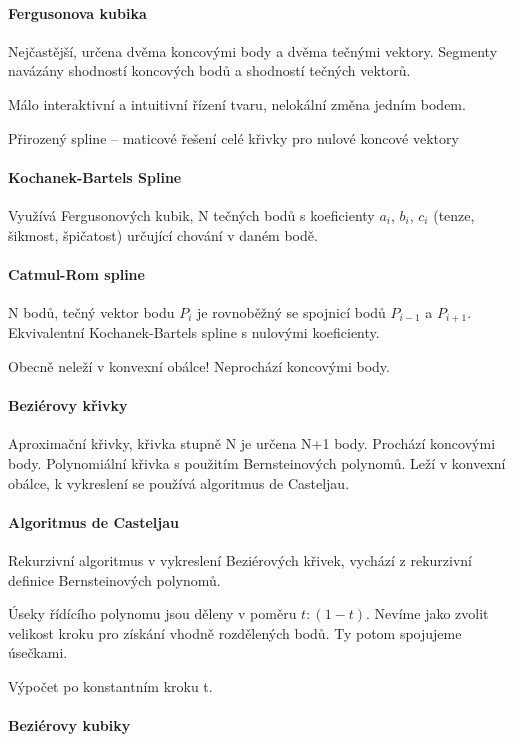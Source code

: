 \documentclass[a4paper, 11pt]{report}
\begin{document}
\paragraph{Fergusonova kubika} Nejčastější, určena dvěma koncovými body a dvěma tečnými vektory. Segmenty navázány shodností koncových bodů a shodností tečných vektorů.

Málo interaktivní a intuitivní řízení tvaru, nelokální změna jedním bodem.

Přirozený spline -- maticové řešení celé křivky pro nulové koncové vektory

\paragraph{Kochanek-Bartels Spline}

Využívá Fergusonových kubik, N tečných bodů s koeficienty $a_i$, $b_i$, $c_i$ (tenze, šikmost, špičatost) určující chování v daném bodě.

\paragraph{Catmul-Rom spline}

N bodů, tečný vektor bodu $P_i$ je rovnoběžný se spojnicí bodů $P_{i-1}$ a $P_{i+1}$. Ekvivalentní Kochanek-Bartels spline s nulovými koeficienty.

Obecně neleží v konvexní obálce! Neprochází koncovými body.

\paragraph{Beziérovy křivky}
Aproximační křivky, křivka stupně N je určena N+1 body. Prochází koncovými body. Polynomiální křivka s použitím Bernsteinových polynomů. Leží v konvexní obálce, k vykreslení se používá algoritmus de Casteljau.

\paragraph{Algoritmus de Casteljau} Rekurzivní algoritmus v vykreslení Beziérových křivek, vychází z rekurzivní definice Bernsteinových polynomů.

Úseky řídícího polynomu jsou děleny v poměru $t : (1-t)$. Nevíme jako zvolit velikost kroku pro získání vhodně rozdělených bodů. Ty potom spojujeme úsečkami.

Výpočet po konstantním kroku t.

\paragraph{Beziérovy kubiky}
\end{document}
